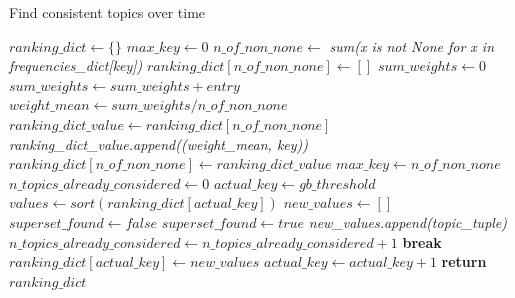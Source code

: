 \begin{algorithm*}
	\caption{Find consistent topics over time}
	\label{find_consistent_topics_over_time_algorithm}
	\begin{algorithmic}[1]
		\State $ranking\_dict\gets \{\}$
		\State $max\_key\gets 0$
			\State $n\_of\_non\_none\gets $ \textit{sum(x is not None for x in frequencies\_dict[key])}
					\State $ranking\_dict[n\_of\_non\_none]\gets []$
				\EndIf
				\State $sum\_weights\gets 0$
						\State $sum\_weights\gets sum\_weights + entry$
					\EndIf
				\EndFor
				\State $weight\_mean\gets sum\_weights / n\_of\_non\_none$
				\State $ranking\_dict\_value\gets ranking\_dict[n\_of\_non\_none]$
				\State \textit{ranking\_dict\_value.append((weight\_mean, key))}
				\State $ranking\_dict[n\_of\_non\_none]\gets ranking\_dict\_value$
					\State $max\_key\gets n\_of\_non\_none$
				\EndIf
			\EndIf
		\EndFor
		\State $n\_topics\_already\_considered\gets 0$
		\State $actual\_key\gets gb\_threshold$
				\State $values\gets sort(ranking\_dict[actual\_key])$
				\State $new\_values\gets []$
					\State $superset\_found\gets false$
							\State $superset\_found\gets true$
						\EndIf
					\EndFor
						\State \textit{new\_values.append(topic\_tuple)}
						\State $n\_topics\_already\_considered\gets n\_topics\_already\_considered + 1$
							\State \textbf{break}
						\EndIf
					\EndIf
				\EndFor
				\State $ranking\_dict[actual\_key]\gets new\_values$
			\EndIf
			\State $actual\_key\gets actual\_key + 1$
		\EndWhile
		\State \textbf{return} $ranking\_dict$
		\EndFunction
	\end{algorithmic}
\end{algorithm*}

